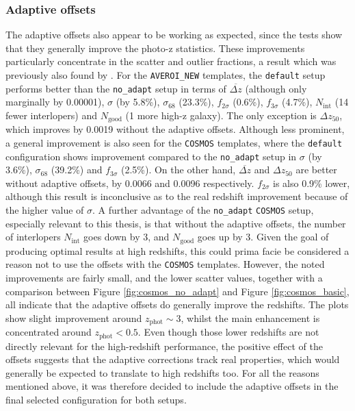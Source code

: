 \subsubsection{Adaptive offsets}
The adaptive offsets also appear to be working as expected, since the tests show that they generally improve the photo-z statistics. These improvements particularly concentrate in the scatter and outlier fractions, a result which was previously also found by \cite{2013ApJ...775...93D}. For the \texttt{AVEROI\_NEW} templates, the \texttt{default} setup performs better than the \texttt{no\_adapt} setup in terms of $\overbar{\Delta z}$ (although only marginally by 0.00001), $\sigma$ (by 5.8\%), $\sigma_{68}$ (23.3\%), $f_{2\sigma}$ (0.6\%), $f_{3\sigma}$ (4.7\%), $N_{\mathrm{int}}$ (14 fewer interlopers) and $N_{\mathrm{good}}$ (1 more high-z galaxy). The only exception is $\Delta z_{50}$, which improves by 0.0019 without the adaptive offsets. Although less prominent, a general improvement is also seen for the \texttt{COSMOS} templates, where the \texttt{default} configuration shows improvement compared to the \texttt{no\_adapt} setup in $\sigma$ (by 3.6\%), $\sigma_{68}$ (39.2\%) and $f_{3\sigma}$ (2.5\%). On the other hand,  $\overbar{\Delta z}$ and $\Delta z_{50}$ are better without adaptive offsets, by 0.0066 and 0.0096 respectively. $f_{2\sigma}$ is also 0.9\% lower, although this result is inconclusive as to the real redshift improvement because of the higher value of $\sigma$. A further advantage of the \texttt{no\_adapt} \texttt{COSMOS} setup, especially relevant to this thesis, is that without the adaptive offsets, the number of interlopers $N_{\mathrm{int}}$ goes down by 3, and $N_{\mathrm{good}}$ goes up by 3. Given the goal of producing optimal results at high redshifts, this could prima facie be considered a reason not to use the offsets with the \texttt{COSMOS} templates. However, the noted improvements are fairly small, and the lower scatter values, together with a comparison between Figure \ref{fig:cosmos_no_adapt} and Figure \ref{fig:cosmos_basic}, all indicate that the adaptive offsets do generally improve the redshifts. The plots show slight improvement around $z_{\mathrm{phot}}\sim3$, whilst the main enhancement is concentrated around $z_{\mathrm{phot}}<0.5$. Even though those lower redshifts are not directly relevant for the high-redshift performance, the positive effect of the offsets suggests that the adaptive corrections track real properties, which would generally be expected to translate to high redshifts too. For all the reasons mentioned above, it was therefore decided to include the adaptive offsets in the final selected configuration for both setups. \par

